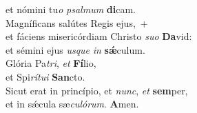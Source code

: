 \oddverse et nómini tu\textit{o} \textit{psal}\textit{mum} \textbf{di}cam.\\
\evenverse Magníficans salútes Regis ejus,~+\\
\evenverse  et fáciens misericórdiam Christo \textit{su}\textit{o} \textbf{Da}vid:~\*\\
\evenverse et sémini ejus \textit{us}\textit{que} \textit{in} \textbf{sǽ}culum.\\
\oddverse Glória Pa\textit{tri}, \textit{et} \textbf{Fí}lio,~\*\\
\oddverse et Spi\textit{rí}\textit{tu}\textit{i} \textbf{San}cto.\\
\evenverse Sicut erat in princípio, et \textit{nunc}, \textit{et} \textbf{sem}per,~\*\\
\evenverse et in sǽcula sæ\textit{cu}\textit{ló}\textit{rum}. \textbf{A}men.\\

